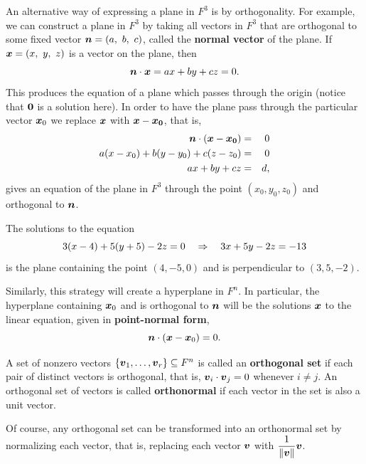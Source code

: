 An alternative way of expressing a plane in $F^3$ is by orthogonality. For example, we can construct a plane in $F^3$ by taking all vectors in $F^3$ that are orthogonal to some fixed vector $\boldsymbol n =(a,\ b,\ c)$, called the \textbf{normal vector} of the plane. If $\boldsymbol x = (x,\ y,\ z)$ is a vector on the plane, then 
\[\boldsymbol n \cdot \boldsymbol x = ax+by+cz = 0.\] This produces the equation of a plane which passes through the origin (notice that $\boldsymbol 0$ is a solution here). In order to have the plane pass through the particular vector $\boldsymbol x_0$ we replace $\boldsymbol x$ with $\boldsymbol x - \boldsymbol{x_0}$, that is, 
\begin{eqnarray*}
\boldsymbol n \cdot (\boldsymbol x - \boldsymbol{x_0}) &=& 0 \\
a(x-x_0) + b(y-y_0) + c(z-z_0) &=& 0\\
ax + by + cz &=& d, 
\end{eqnarray*} gives an equation of the plane in $F^3$ through the point $(x_0, y_0, z_0)$ and orthogonal to $\boldsymbol n$.\\

\begin{Exam} The solutions to the equation 
\[3(x-4) + 5(y+5) - 2z = 0 \quad\Rightarrow\quad 3x+5y-2z = -13\] is the plane containing the point $(4,-5,0)$ and is perpendicular to $(3, 5, -2)$.
\end{Exam}\vs

Similarly, this strategy will create a hyperplane in $F^n$. In particular, the hyperplane containing $\boldsymbol x_0$ and is orthogonal to $\boldsymbol n$ will be the solutions $\boldsymbol x$ to the linear equation, given in \textbf{point-normal form}, \begin{equation} \boldsymbol n\cdot (\boldsymbol x-\boldsymbol x_0)=0.\end{equation}\vs


\begin{Def} A set of nonzero vectors $\{\boldsymbol v_1, \ldots, \boldsymbol v_r\}\subseteq F^n$ is called an \textbf{orthogonal set} if each pair of distinct vectors is orthogonal, that is, $\boldsymbol v_i \cdot \boldsymbol v_j = 0$ whenever $i\neq j$. An orthogonal set of vectors is called \textbf{orthonormal} if each vector in the set is also a unit vector.
\end{Def}\vs


Of course, any orthogonal set can be transformed into an orthonormal set by normalizing each vector, that is, replacing each vector $\boldsymbol v$ with $\dfrac{1}{\Vert \boldsymbol v \Vert}\boldsymbol v$.\\

